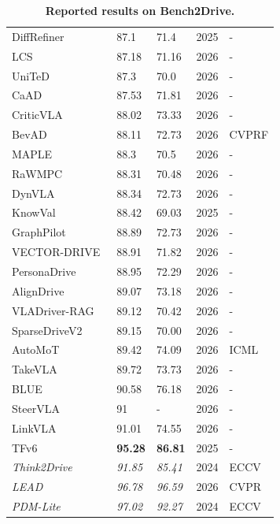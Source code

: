 \documentclass[10pt,twocolumn,letterpaper]{article}
\begin{document}
\begin{table}[t]
\begin{tabular}{l|ll|ll}
DiffRefiner~\cite{Yin2025ARXIV} & 87.1 & 71.4 & 2025 & - \\
LCS~\cite{Hu2026ARXIV} & 87.18 & 71.16 & 2026 & - \\
UniTeD~\cite{Zhao2026ARXIVc} & 87.3 & 70.0 & 2026 & - \\
CaAD~\cite{Moon2026ARXIV} & 87.53 & 71.81 & 2026 & - \\
CriticVLA~\cite{Yang2026ARXIV} & 88.02 & 73.33 & 2026 & - \\
BevAD~\cite{Holtz2026CVPR} & 88.11 & 72.73 & 2026 & CVPRF \\
MAPLE~\cite{Yasarla2026ARXIV} & 88.3 & 70.5 & 2026 & - \\
RaWMPC~\cite{Sun2026ARXIV} & 88.31 & 70.48 & 2026 & - \\
DynVLA~\cite{Shang2026ARXIV} & 88.34 & 72.73 & 2026 & - \\
KnowVal~\cite{Xia2025ARXIV} & 88.42 & 69.03 & 2025 & - \\
GraphPilot~\cite{Schmidt2025ARXIV} & 88.89 & 72.73 & 2026 & - \\
VECTOR-DRIVE~\cite{Zhao2026ARXIVb} & 88.91 & 71.82 & 2026 & - \\
PersonaDrive~\cite{Srewa2026ARXIV} & 88.95 & 72.29 & 2026 & - \\
AlignDrive~\cite{Wu2026ARXIV} & 89.07 & 73.18 & 2026 & - \\
VLADriver-RAG~\cite{Zhao2026ARXIV} & 89.12 & 70.42 & 2026 & - \\
SparseDriveV2~\cite{Sun2026ARXIVb} & 89.15 & 70.00 & 2026 & - \\
AutoMoT~\cite{Huang2026ICML} & 89.42 & 74.09 & 2026 & ICML \\
TakeVLA~\cite{Gao2026ARXIV} & 89.72 & 73.73 & 2026 & - \\
BLUE~\cite{Ling2026ARXIV} & 90.58 & 76.18 & 2026 & - \\
SteerVLA~\cite{Gao2026ARXIV} & 91 & - & 2026 & - \\
LinkVLA~\cite{Wang2026ARXIV} & 91.01 & 74.55 & 2026 & - \\
TFv6~\cite{Nguyen2026CVPR} & \textbf{95.28} & \textbf{86.81} & 2025 & - \\
\midrule
\textit{Think2Drive}~\cite{Li2024ECCV} & \textit{91.85} & \textit{85.41} & 2024 & ECCV \\
\textit{LEAD}~\cite{Nguyen2026CVPR} & \textit{96.78} & \textit{96.59} & 2026 & CVPR \\
\textit{PDM-Lite}~\cite{Sima2024ECCV} & \textit{97.02} & \textit{92.27} & 2024 & ECCV \\
\bottomrule
\end{tabular}
\caption{\textbf{Reported results on Bench2Drive.}}
\label{tab:b2d}
\end{table}


\clearpage


{
    \small
    
    
}
\end{document}

